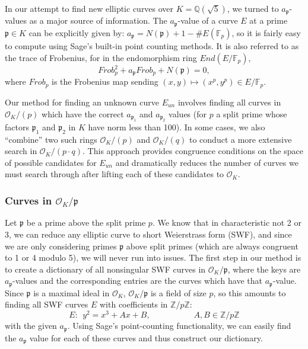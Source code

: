 In our attempt to find new elliptic curves over $K=\mathbb{Q}(\sqrt{5})$, we turned to $a_\mathfrak{p}$-values as a major source of information. The $a_\mathfrak{p}$-value of a curve $E$ at a prime $\mathfrak{p} \in K$ can be explicitly given by: $a_\mathfrak{p}=N(\mathfrak{p})+1-\#E(\mathbb{F}_p)$, so it is fairly easy to compute using Sage's built-in point counting methods. It is also referred to as the trace of Frobenius, for in the endomorphism ring $End(E/\mathbb{F}_p)$,
\begin{equation}
Frob_p^2 + a_\mathfrak{p}Frob_p + N(\mathfrak{p}) = 0, \nonumber
\end{equation}
where $Frob_p$ is the Frobenius map sending $(x,y) \mapsto (x^p,y^p) \in E/\mathbb{F}_p$.

Our method for finding an unknown curve $E_{un}$ involves finding all curves in $\mathcal{O}_K/(p)$ which have the correct $a_{\mathfrak{p}_1}$ and $a_{\mathfrak{p}_2}$ values (for $p$ a split prime whose factors $\mathfrak{p}_1$ and $\mathfrak{p}_2$ in $K$ have norm less than 100). In some cases, we also ``combine'' two such rings $\mathcal{O}_K/(p)$ and $\mathcal{O}_K/(q)$ to conduct a more extensive search in $\mathcal{O}_K/(p\cdot q)$. This approach provides congruence conditions on the space of possible candidates for $E_{un}$ and dramatically reduces the number of curves we must search through after lifting each of these candidates to $\mathcal{O}_K$.

\subsubsection{Curves in $\mathcal{O}_K/\mathfrak{p}$}

Let $\mathfrak{p}$ be a prime above the split prime $p$. We know that in characteristic not 2 or 3, we can reduce any elliptic curve to short Weierstrass form (SWF), and since we are only considering primes $\mathfrak{p}$ above split primes (which are always congruent to 1 or 4 modulo 5), we will never run into issues. The first step in our method is to create a dictionary of all nonsingular SWF curves in $\mathcal{O}_K/\mathfrak{p}$, where the keys are $a_\mathfrak{p}$-values and the corresponding entries are the curves which have that $a_\mathfrak{p}$-value. Since $\mathfrak{p}$ is a maximal ideal in $\mathcal{O}_K$, $\mathcal{O}_K/\mathfrak{p}$ is a field of size $p$, so this amounts to finding all SWF curves $E$ with coefficients in $\mathbb{Z}/p\mathbb{Z}$:
\begin{equation}
E: \ \ y^2=x^3+Ax+B, \phantom{asdpoifaofi} A,B \in \mathbb{Z}/p\mathbb{Z} \nonumber
\end{equation}
\noindent with the given $a_\mathfrak{p}$. Using Sage's point-counting functionality, we can easily find the $a_\mathfrak{p}$ value for each of these curves and thus construct our dictionary.

